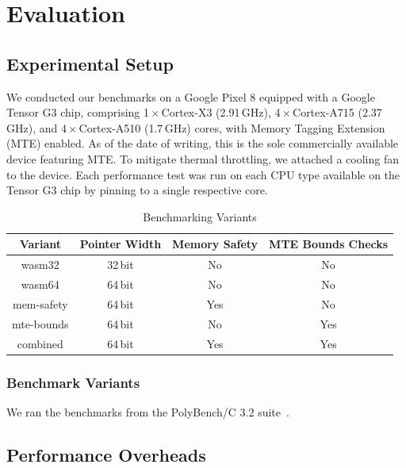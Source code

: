 \chapter{Evaluation}
\label{ch:eval}


\section{Experimental Setup}\label{sec:experimental-setup}

We conducted our benchmarks on a Google Pixel 8 equipped with a Google Tensor G3 chip, comprising 1\,$\times$\,Cortex-X3 (2.91\,GHz), 4\,$\times$\,Cortex-A715 (2.37\,GHz), and 4\,$\times$\,Cortex-A510 (1.7\,GHz) cores, with Memory Tagging Extension (MTE) enabled.
As of the date of writing, this is the sole commercially available device featuring MTE.
To mitigate thermal throttling, we attached a cooling fan to the device.
Each performance test was run on each CPU type available on the Tensor G3 chip by pinning to a single respective core.

\begin{table}[ht]
    \centering
    \small
    \begin{tabular}{c || c c c}
        \hline
        \textbf{Variant} & \textbf{Pointer Width} & \textbf{Memory Safety} & \textbf{MTE Bounds Checks} \\
        \hline
        wasm32     & 32\,bit & No  & No  \\
        wasm64     & 64\,bit & No  & No  \\
        mem-safety & 64\,bit & Yes & No  \\
        mte-bounds & 64\,bit & No  & Yes \\
        combined   & 64\,bit & Yes & Yes \\
        \hline
    \end{tabular}
    \caption{Benchmarking Variants}
    \label{tab:benchmark-variants}
\end{table}

\subsection{Benchmark Variants}
\label{subsec:benchmark-variants}
We ran the benchmarks from the PolyBench/C 3.2 suite~\cite{polybenchc}.

\section{Performance Overheads}
\label{sec:performance-overheads}

